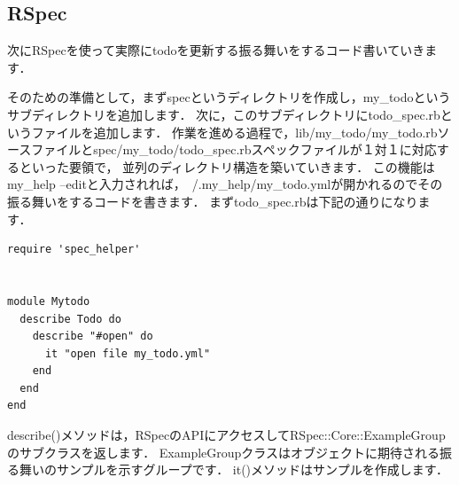 \subsection{RSpec}
次にRSpecを使って実際にtodoを更新する振る舞いをするコード書いていきます．

そのための準備として，まずspecというディレクトリを作成し，my\_todoというサブディレクトリを追加します．
次に，このサブディレクトリにtodo\_spec.rbというファイルを追加します．
作業を進める過程で，lib/my\_todo/my\_todo.rbソースファイルとspec/my\_todo/todo\_spec.rbスペックファイルが１対１に対応するといった要領で，
並列のディレクトリ構造を築いていきます．
この機能はmy\_help --editと入力されれば，~/.my\_help/my\_todo.ymlが開かれるのでその振る舞いをするコードを書きます．
まずtodo\_spec.rbは下記の通りになります．
\begin{lstlisting}[style=customRuby,basicstyle={\scriptsize\ttfamily}]
require 'spec_helper'


module Mytodo
  describe Todo do
    describe "#open" do
      it "open file my_todo.yml" 
    end
  end
end

\end{lstlisting}
describe()メソッドは，RSpecのAPIにアクセスしてRSpec::Core::ExampleGroupのサブクラスを返します．
ExampleGroupクラスはオブジェクトに期待される振る舞いのサンプルを示すグループです．
it()メソッドはサンプルを作成します．

